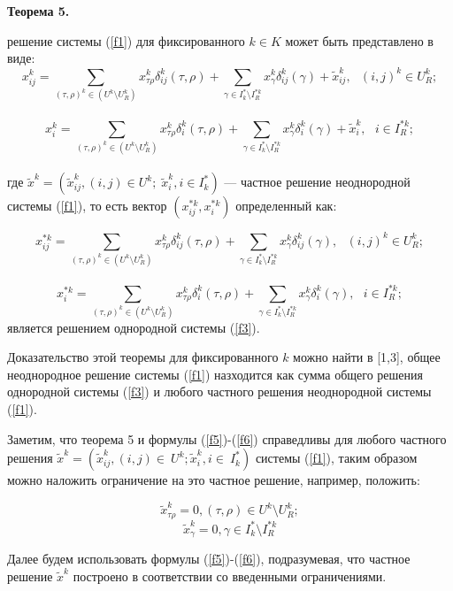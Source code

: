 \documentclass[14pt]{extarticle}%
\begin{document}
    \textbf{Теорема 5.}  { решение системы (\ref{f1}) для фиксированного $k\in K$ может быть представлено в виде:
    \begin{equation}
        x^k_{ij}=\sum_{(\tau, \rho)^k\in (U^k\setminus U^k_R)}x^k_{\tau \rho}\delta^k_{ij}(\tau,\rho)+\sum_{\gamma\in I^*_k\setminus I^{*k}_R}x^k_\gamma\delta^k_{ij}(\gamma)+\widetilde x^k_{ij},\,\,\,\, (i,j)^k\in U^k_R;\label{f5}\end{equation}
    \\
    \begin{equation}
        x^k_i=\sum_{(\tau, \rho)^k\in (U^k\setminus U^k_R)}x^k_{\tau \rho}\delta^k_{i}(\tau,\rho)+\sum_{\gamma\in I^*_k\setminus I^{*k}_R}x^k_\gamma\delta^k_{i}(\gamma)+\widetilde x^k_{i},\,\,\,\, i\in I^{*k}_R;\label{f6}\end{equation}
        \\
        где $\widetilde x^k=(\widetilde x^k_{ij}, (i,j)\in U^k;\; \widetilde x^k_i, i\in I^*_k)$ --- частное решение неоднородной системы (\ref{f1}), то есть вектор $(x^{*k}_{ij},x^{*k}_i)$ определенный как:
        
        $$
        x^{*k}_{ij}=\sum_{(\tau, \rho)^k\in (U^k\setminus U^k_R)}x^k_{\tau \rho}\delta^k_{ij}(\tau,\rho)+\sum_{\gamma\in I^*_k\setminus I^{*k}_R}x^k_\gamma\delta^k_{ij}(\gamma),\,\,\,\, (i,j)^k\in U^k_R;$$
    \\
    $$
        x^{*k}_i=\sum_{(\tau, \rho)^k\in (U^k\setminus U^k_R)}x^k_{\tau \rho}\delta^k_{i}(\tau,\rho)+\sum_{\gamma\in I^*_k\setminus I^{*k}_R}x^k_\gamma\delta^k_{i}(\gamma),\,\,\,\, i\in I^{*k}_R;$$
    является решением однородной системы (\ref{f3}).}

Доказательство этой теоремы для фиксированного $k$ можно найти в [1,3], общее неоднородное решение системы (\ref{f1}) назходится как сумма общего решения однородной системы (\ref{f3}) и любого частного решения неоднородной системы (\ref{f1}).

Заметим, что теорема 5 и формулы (\ref{f5})-(\ref{f6}) справедливы для любого частного решения $\widetilde x^k=(\widetilde x^k_{ij}, (i,j)\in~U^k; \widetilde x^k_i, i\in~I^*_k)$ системы (\ref{f1}), таким образом можно наложить ограничение на это частное решение, например, положить:

$$\widetilde x^k_{\tau\rho}=0, (\tau,\rho)\in U^k\setminus U^k_R;$$
$$ \widetilde x^k_\gamma=0, \gamma\in I^*_k\setminus I^{*k}_R$$


Далее будем использовать формулы (\ref{f5})-(\ref{f6}), подразумевая, что частное решение $\widetilde x^k$ построено в соответствии со введенными ограничениями.\\
\end{document}
